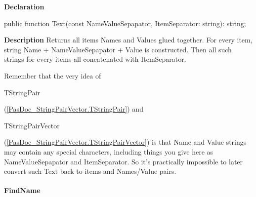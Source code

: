 \documentclass{report}
\newif\ifpdf
\begin{document}
\label{PasDoc_StringPairVector.TStringPairVector-Text}
\begin{list}{}{
\setlength{\itemindent}{0cm}
\setlength{\listparindent}{0cm}
\setlength{\leftmargin}{\evensidemargin}
\addtolength{\leftmargin}{\tmplength}
\settowidth{\labelsep}{X}
\addtolength{\leftmargin}{\labelsep}
\setlength{\labelwidth}{\tmplength}
}
\item[\textbf{Declaration}\hfill]
\ifpdf
\begin{flushleft}
\fi
\begin{ttfamily}
public function Text(const NameValueSepapator, ItemSeparator: string): string;\end{ttfamily}

\ifpdf
\end{flushleft}
\fi

\par
\item[\textbf{Description}]
Returns all items Names and Values glued together. For every item, string Name + NameValueSepapator + Value is constructed. Then all such strings for every items all concatenated with ItemSeparator.

Remember that the very idea of \begin{ttfamily}TStringPair\end{ttfamily}(\ref{PasDoc_StringPairVector.TStringPair}) and \begin{ttfamily}TStringPairVector\end{ttfamily}(\ref{PasDoc_StringPairVector.TStringPairVector}) is that Name and Value strings may contain any special characters, including things you give here as NameValueSepapator and ItemSeparator. So it's practically impossible to later convert such Text back to items and Names/Value pairs.

\end{list}
\paragraph*{FindName}\hspace*{\fill}
\end{document}
